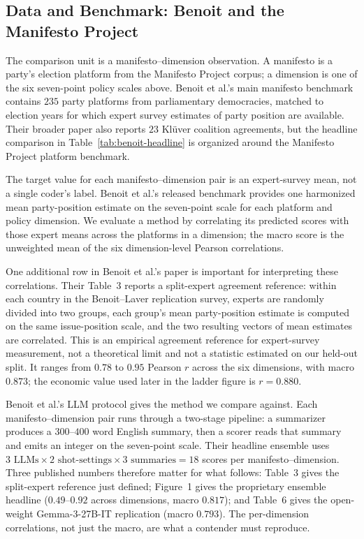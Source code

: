 \subsection{Data and Benchmark: Benoit and the Manifesto Project}

The comparison unit is a manifesto--dimension observation. A manifesto
is a party's election platform from the Manifesto Project corpus; a
dimension is one of the six seven-point policy scales above. Benoit et
al.'s main manifesto benchmark contains $235$ party platforms from
parliamentary democracies, matched to election years for which expert
survey estimates of party position are available. Their broader paper
also reports $23$ Kl\"uver coalition agreements, but the headline
comparison in Table~\ref{tab:benoit-headline} is organized around the
Manifesto Project platform benchmark.

The target value for each manifesto--dimension pair is an expert-survey
mean, not a single coder's label. Benoit et al.'s released benchmark
provides one harmonized mean party-position estimate on the seven-point
scale for each platform and policy dimension. We evaluate a method by
correlating its predicted scores with those expert means across the
platforms in a dimension; the macro score is the unweighted mean of the
six dimension-level Pearson correlations.

One additional row in Benoit et al.'s paper is important for interpreting
these correlations. Their Table~3 reports a split-expert agreement
reference: within each country in the Benoit--Laver replication survey,
experts are randomly divided into two groups, each group's mean
party-position estimate is computed on the same issue-position scale,
and the two resulting vectors of mean estimates are correlated. This is
an empirical agreement reference for expert-survey measurement, not a
theoretical limit and not a statistic estimated on our held-out
split. It ranges from $0.78$ to $0.95$ Pearson $r$ across the six
dimensions, with macro $0.873$; the economic value used later in the
ladder figure is $r = 0.880$.

Benoit et al.'s LLM protocol gives the method we compare against. Each
manifesto--dimension pair runs through a two-stage pipeline: a summarizer
produces a $300$--$400$ word English summary, then a scorer reads that
summary and emits an integer on the seven-point scale. Their headline
ensemble uses
$3 \text{ LLMs} \times 2 \text{ shot-settings} \times 3 \text{ summaries}
= 18$ scores per manifesto--dimension. Three published numbers therefore
matter for what follows: Table~3 gives the split-expert reference just
defined; Figure~1 gives the proprietary ensemble headline ($0.49$--$0.92$
across dimensions, macro $0.817$); and Table~6 gives the open-weight
Gemma-3-27B-IT replication (macro $0.793$). The per-dimension
correlations, not just the macro, are what a contender must reproduce.

